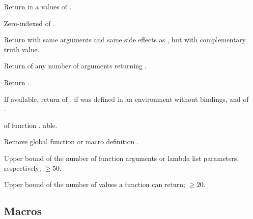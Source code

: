 \begin{LIST}{1cm}
  {
  Return in a  values of .
  }

  {
  Zero-indexed  of .
  }

  {
  Return  with same arguments and same side effects
  as , but with complementary truth value.
  }

  {
  Return  of any number of arguments returning .
  }

  {
  Return .
  }

  {
  If available, return  of ,
  \retvalii{\NIL} if  was defined in an environment
  without bindings, and  of . 
  }

  {
   of function . able.
  }

  {
  Remove global function or macro definition .
  }

  {
  Upper bound of the number of function arguments or lambda list
  parameters, respectively; $\geq50$. 
  }

  {
  Upper bound of the number of values a function can return; $\geq20$.
  }

\end{LIST}


\subsection{Macros}
\label{section:Macros}

